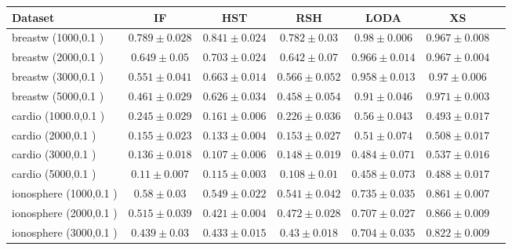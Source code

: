\documentclass[11pt,onecolumn]{article}
\begin{document}
\begin{footnotesize}
\begin{table}[p!]
		\begin{tabular}{lcccccc}
				\toprule
				\textbf{Dataset} & \textbf{IF} &  \textbf{HST} & \textbf{RSH} &  \textbf{LODA}  & \textbf{XS}\\
\toprule
breastw (1000,0.1 )& $0.789 \pm 0.028$ &  $0.841 \pm 0.024$ &  $0.782 \pm 0.03$ &  $0.98 \pm 0.006$ &  $0.967 \pm 0.008$    \\
breastw (2000,0.1 )& $0.649 \pm 0.05$ &  $0.703 \pm 0.024$ &  $0.642 \pm 0.07$ &  $0.966 \pm 0.014$ &  $0.967 \pm 0.004$    \\
breastw (3000,0.1 )& $0.551 \pm 0.041$ &  $0.663 \pm 0.014$ &  $0.566 \pm 0.052$ &  $0.958 \pm 0.013$ &  $0.97 \pm 0.006$    \\
breastw (5000,0.1 )& $0.461 \pm 0.029$ &  $0.626 \pm 0.034$ &  $0.458 \pm 0.054$ &  $0.91 \pm 0.046$ &  $0.971 \pm 0.003$    \\
\midrule
cardio (1000.0,0.1 )& $0.245 \pm 0.029$ &  $0.161 \pm 0.006$ &  $0.226 \pm 0.036$ &  $0.56 \pm 0.043$ &  $0.493 \pm 0.017$    \\
cardio (2000,0.1 )& $0.155 \pm 0.023$ &  $0.133 \pm 0.004$ &  $0.153 \pm 0.027$ &  $0.51 \pm 0.074$ &  $0.508 \pm 0.017$    \\
cardio (3000,0.1 )& $0.136 \pm 0.018$ &  $0.107 \pm 0.006$ &  $0.148 \pm 0.019$ &  $0.484 \pm 0.071$ &  $0.537 \pm 0.016$    \\
cardio (5000,0.1 )& $0.11 \pm 0.007$ &  $0.115 \pm 0.003$ &  $0.108 \pm 0.01$ &  $0.458 \pm 0.073$ &  $0.488 \pm 0.017$    \\
\midrule
ionosphere (1000,0.1 )& $0.58 \pm 0.03$ &  $0.549 \pm 0.022$ &  $0.541 \pm 0.042$ &  $0.735 \pm 0.035$ &  $0.861 \pm 0.007$    \\
ionosphere (2000,0.1 )& $0.515 \pm 0.039$ &  $0.421 \pm 0.004$ &  $0.472 \pm 0.028$ &  $0.707 \pm 0.027$ &  $0.866 \pm 0.009$    \\
ionosphere (3000,0.1 )& $0.439 \pm 0.03$ &  $0.433 \pm 0.015$ &  $0.43 \pm 0.018$ &  $0.704 \pm 0.035$ &  $0.822 \pm 0.009$    \\

\end{tabular}
\end{table}
\end{footnotesize}
\end{document}
